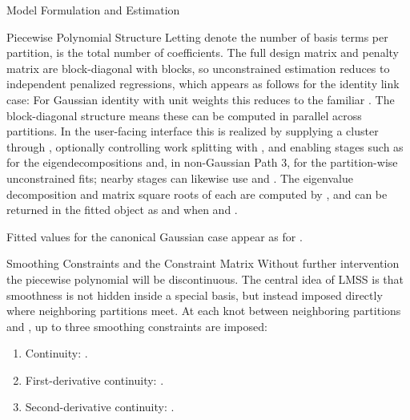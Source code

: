 \begin{Section}{Model Formulation and Estimation}
\begin{SubSection}{Piecewise Polynomial Structure}
Letting  denote the number of basis terms per partition,
 is the total number of coefficients. The full design matrix
 and penalty matrix \eqn{\boldsymbol{\Lambda}}{} are
block-diagonal with  blocks, so unconstrained estimation reduces to
 independent penalized regressions, which appears as follows for the identity link case:
For Gaussian identity with unit weights this reduces to the familiar
.
The block-diagonal structure means these can be computed in parallel across
partitions. In the user-facing interface this is realized by supplying a
cluster through , optionally controlling work splitting with
, and enabling stages such as 
for the eigendecompositions and, in non-Gaussian Path 3, 
for the partition-wise unconstrained fits; nearby stages can likewise use
 and . The eigenvalue
decomposition and matrix square roots of each  are
computed by , and can be returned in the fitted
object as  and  when  and
.

Fitted values for the canonical Gaussian case appear as
for .
\end{SubSection}


%
\begin{SubSection}{Smoothing Constraints and the Constraint Matrix}
Without further intervention the piecewise polynomial will be discontinuous.
The central idea of LMSS is that smoothness is not hidden inside a special
basis, but instead imposed directly where neighboring partitions meet.
At each knot  between neighboring partitions  and
, up to three smoothing constraints are imposed:
\begin{enumerate}

\item{} Continuity: .
\item{} First-derivative continuity: .
\item{} Second-derivative continuity: .


\end{enumerate}
\end{SubSection}
\end{Section}

